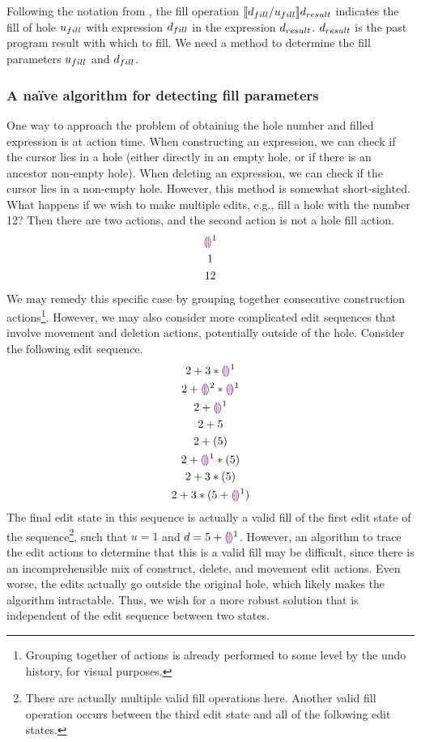 Following the notation from \cite{conf/popl/HazelnutLive19}, the fill operation $\llbracket{}d_{fill}/u_{fill}\rrbracket{}d_{result}$ indicates the fill of hole $u_{fill}$ with expression $d_{fill}$ in the expression $d_{result}$. $d_{result}$ is the past program result with which to fill. We need a method to determine the fill parameters $u_{fill}$ and $d_{fill}$.

\subsubsection{A na\"ive algorithm for detecting fill parameters}
\label{sec:far-detect-naive}

One way to approach the problem of obtaining the hole number and filled expression is at action time. When constructing an expression, we can check if the cursor lies in a hole (either directly in an empty hole, or if there is an ancestor non-empty hole). When deleting an expression, we can check if the cursor lies in a non-empty hole. However, this method is somewhat short-sighted. What happens if we wish to make multiple edits, e.g., fill a hole with the number 12? Then there are two actions, and the second action is not a hole fill action.
\begin{gather*}
  \textcolor{violet}{\llparenthesis}\textcolor{violet}{\rrparenthesis}^1 \\
  1 \\
  12
\end{gather*}
We may remedy this specific case by grouping together consecutive construction actions\footnote{Grouping together of actions is already performed to some level by the undo history, for visual purposes.}. However, we may also consider more complicated edit sequences that involve movement and deletion actions, potentially outside of the hole. Consider the following edit sequence.
\begin{gather*}
  2+3*\textcolor{violet}{\llparenthesis}\textcolor{violet}{\rrparenthesis}^1 \\
  2+\textcolor{violet}{\llparenthesis}\textcolor{violet}{\rrparenthesis}^2*\textcolor{violet}{\llparenthesis}\textcolor{violet}{\rrparenthesis}^1\\
  2+\textcolor{violet}{\llparenthesis}\textcolor{violet}{\rrparenthesis}^1\\
  2+5 \\
  2+(5) \\
  2+\textcolor{violet}{\llparenthesis}\textcolor{violet}{\rrparenthesis}^1*(5) \\
  2+3*(5) \\
  2+3*(5+\textcolor{violet}{\llparenthesis}\textcolor{violet}{\rrparenthesis}^1)
\end{gather*}
The final edit state in this sequence is actually a valid fill of the first edit state of the sequence\footnote{There are actually multiple valid fill operations here. Another valid fill operation occurs between the third edit state and all of the following edit states.}, such that $u=1$ and $d=5+\textcolor{violet}{\llparenthesis}\textcolor{violet}{\rrparenthesis}^1$. However, an algorithm to trace the edit actions to determine that this is a valid fill may be difficult, since there is an incomprehensible mix of construct, delete, and movement edit actions. Even worse, the edits actually go outside the original hole, which likely makes the algorithm intractable. Thus, we wish for a more robust solution that is independent of the edit sequence between two states.

